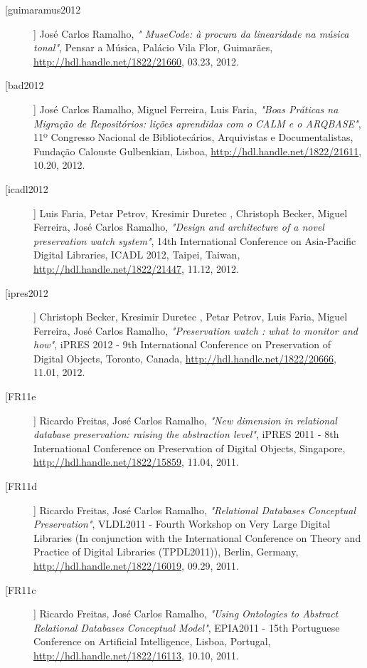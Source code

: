\begin{description}
\item[[guimaramus2012]]
    \textsf{José Carlos Ramalho}, \emph{"	MuseCode: à procura da linearidade na música tonal"}, Pensar a Música, Palácio Vila Flor, Guimarães, \url{http://hdl.handle.net/1822/21660}, 03.23, 2012.

\item[[bad2012]]
    \textsf{José Carlos Ramalho, Miguel Ferreira, Luis Faria}, \emph{"Boas Práticas na Migração de Repositórios: lições aprendidas com o CALM e o ARQBASE"}, 11º Congresso Nacional de Bibliotecários, Arquivistas e Documentalistas, Fundação Calouste Gulbenkian, Lisboa, \url{http://hdl.handle.net/1822/21611}, 10.20, 2012.

\item[[icadl2012]]
    \textsf{Luis Faria, Petar Petrov, Kresimir Duretec , Christoph Becker, Miguel Ferreira, José Carlos Ramalho}, \emph{"Design and architecture of a novel preservation watch system"}, 14th International Conference on Asia-Pacific Digital Libraries, ICADL 2012, Taipei, Taiwan, \url{http://hdl.handle.net/1822/21447}, 11.12, 2012.

\item[[ipres2012]]
    \textsf{Christoph Becker, Kresimir Duretec , Petar Petrov, Luis Faria, Miguel Ferreira, José Carlos Ramalho}, \emph{"Preservation watch : what to monitor and how"}, iPRES 2012 - 9th International Conference on Preservation of Digital Objects, Toronto, Canada, \url{http://hdl.handle.net/1822/20666}, 11.01, 2012.

\item[[FR11e]]
    \textsf{Ricardo Freitas, José Carlos Ramalho}, \emph{"New dimension in relational database preservation: raising the abstraction level"}, iPRES 2011 - 8th International Conference on Preservation of Digital Objects, Singapore, \url{http://hdl.handle.net/1822/15859}, 11.04, 2011.

\item[[FR11d]]
    \textsf{Ricardo Freitas, José Carlos Ramalho}, \emph{"Relational Databases Conceptual Preservation"}, VLDL2011 - Fourth Workshop on Very Large Digital Libraries (In conjunction with the International Conference on Theory and Practice of Digital Libraries (TPDL2011)), Berlin, Germany, \url{http://hdl.handle.net/1822/16019}, 09.29, 2011.

\item[[FR11c]]
    \textsf{Ricardo Freitas, José Carlos Ramalho}, \emph{"Using Ontologies to Abstract Relational Databases Conceptual Model"}, EPIA2011 - 15th Portuguese Conference on Artificial Intelligence, Lisboa, Portugal, \url{http://hdl.handle.net/1822/16113}, 10.10, 2011.


\end{description}
